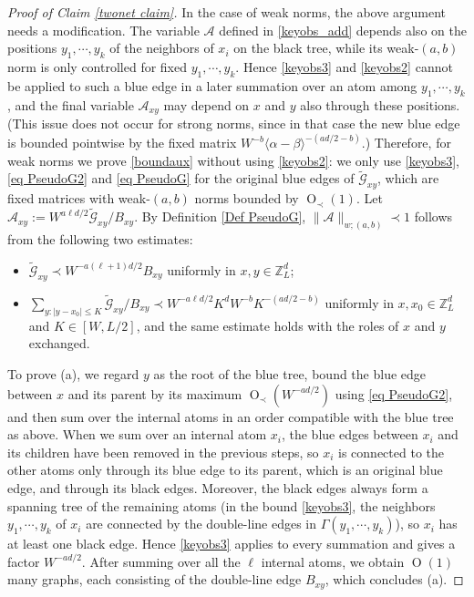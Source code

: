\documentclass{article}
\newcommand{\1}{\mathds{1}}
\numberwithin{equation}{section}
\newcommand{\al}{\alpha}
\renewcommand{\cal}{\mathcal}
\newcommand{\wt}{\widetilde}
\renewcommand{\leq}{\leqslant}
\renewcommand{\le}{\leq}
\newcommand{\Z}{\mathbb{Z}}
\DeclareMathOperator{\OO}{O}
\theoremstyle{plain} %
\theoremstyle{remark}
\begin{document}
\begin{proof}[Proof of Claim \ref{twonet claim}]
In the case of weak norms, the above argument needs a modification. The variable $\cal A$ defined in \eqref{keyobs_add} depends also on the positions $y_1,\cdots,y_k$ of the neighbors of $x_i$ on the black tree, while its weak-$(a,b)$ norm is only controlled for fixed $y_1,\cdots,y_k$. Hence \eqref{keyobs3} and \eqref{keyobs2} cannot be applied to such a blue edge in a later summation over an atom among $y_1,\cdots,y_k$, and the final variable $\cal A_{xy}$ may depend on $x$ and $y$ also through these positions. (This issue does not occur for strong norms, since in that case the new blue edge is bounded pointwise by the fixed matrix $W^{-b}\langle \al-\beta\rangle^{-(ad/2-b)}$.) Therefore, for weak norms we prove \eqref{boundaux} without using \eqref{keyobs2}: we only use \eqref{keyobs3}, \eqref{eq PseudoG2} and \eqref{eq PseudoG} for the original blue edges of $\wt{\cal G}_{xy}$, which are fixed matrices with weak-$(a,b)$ norms bounded by $\OO_\prec(1)$. Let $\cal A_{xy}:=W^{a\ell d/2}\wt{\cal G}_{xy}/B_{xy}$. By Definition \ref{Def PseudoG}, $\|\cal A\|_{w;(a,b)}\prec 1$ follows from the following two estimates: 
\begin{itemize}
\item[(a)] $\wt{\cal G}_{xy}\prec W^{-a(\ell+1)d/2}B_{xy}$ uniformly in $x,y\in\Z_L^d$;
\item[(b)] $\sum_{y:|y-x_0|\le K}\wt{\cal G}_{xy}/B_{xy}\prec W^{-a\ell d/2}K^{d}W^{-b}K^{-(ad/2-b)}$ uniformly in $x,x_0\in\Z_L^d$ and $K\in[W,L/2]$, and the same estimate holds with the roles of $x$ and $y$ exchanged.
\end{itemize}
To prove (a), we regard $y$ as the root of the blue tree, bound the blue edge between $x$ and its parent by its maximum $\OO_\prec(W^{-ad/2})$ using \eqref{eq PseudoG2}, and then sum over the internal atoms in an order compatible with the blue tree as above. When we sum over an internal atom $x_i$, the blue edges between $x_i$ and its children have been removed in the previous steps, so $x_i$ is connected to the other atoms only through its blue edge to its parent, which is an original blue edge, and through its black edges. Moreover, the black edges always form a spanning tree of the remaining atoms (in the bound \eqref{keyobs3}, the neighbors $y_1,\cdots,y_k$ of $x_i$ are connected by the double-line edges in $\Gamma(y_1,\cdots,y_k)$), so $x_i$ has at least one black edge. Hence \eqref{keyobs3} applies to every summation and gives a factor $W^{-ad/2}$. After summing over all the $\ell$ internal atoms, we obtain $\OO(1)$ many graphs, each consisting of the double-line edge $B_{xy}$, which concludes (a).


\end{proof}
\end{document}
